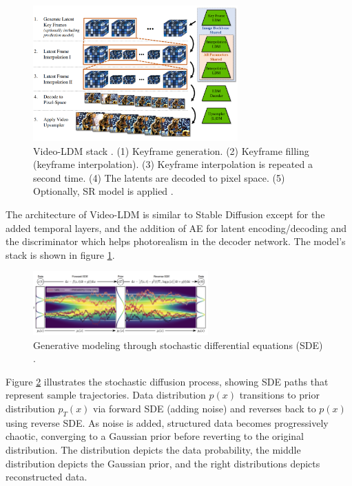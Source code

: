 \begin{figure}
    \centering
    \includegraphics[width=0.7\textwidth]{images/video_ldm/stack.png}
    \caption{Video-LDM stack \cite{video_ldm}. (1) Keyframe generation. (2) Keyframe filling (keyframe interpolation). (3) Keyframe interpolation is repeated a second time. (4) The latents are decoded to pixel space. (5) Optionally, SR model is applied \cite{video_ldm}.}
    \label{fig:video_ldm_stack}
\end{figure}

The architecture of Video-LDM is similar to Stable Diffusion except for the added temporal layers, and the addition of AE for latent encoding/decoding and the discriminator which helps photorealism in the decoder network. The model's stack is shown in figure \ref{fig:video_ldm_stack}.

\begin{figure}
    \centering
    \includegraphics[width=0.6\textwidth]{images/video_ldm/ddpm_sde.png}
    \caption{Generative modeling through stochastic differential equations (SDE) \cite{song2020score}.}
    \label{fig:video_ldm_ode}
\end{figure}

Figure \ref{fig:video_ldm_ode} illustrates the stochastic diffusion process, showing SDE paths that represent sample trajectories. Data distribution $p(x)$ transitions to prior distribution $p_T(x)$ via forward SDE (adding noise) and reverses back to $p(x)$ using reverse SDE. As noise is added, structured data becomes progressively chaotic, converging to a Gaussian prior before reverting to the original distribution. The distribution depicts the data probability, the middle distribution depicts the Gaussian prior, and the right distributions depicts reconstructed data.

